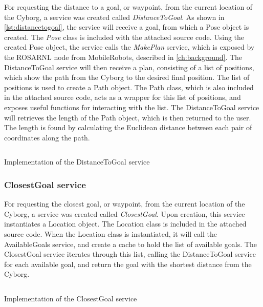 \documentclass[\rootfolder/main.tex]{subfiles}
\begin{document}
For requesting the distance to a goal, or waypoint, from the current location of the Cyborg, a service was created called \emph{DistanceToGoal}.
As shown in \cref{lst:distancetogoal}, the service will receive a goal, from which a Pose object is created.
The \emph{Pose} class is included with the attached source code.
Using the created Pose object, the service calls the \emph{MakePlan} service, which is exposed by the ROSARNL node from MobileRobots, described in \cref{ch:background}.
The DistanceToGoal service will then receive a plan, consisting of a list of positions, which show the path from the Cyborg to the desired final position.
The list of positions is used to create a Path object.
The Path class, which is also included in the attached source code, acts as a wrapper for this list of positions, and exposes useful functions for interacting with the list.
The DistanceToGoal service will retrieves the length of the Path object, which is then returned to the user.
The length is found by calculating the Euclidean distance between each pair of coordinates along the path.

\begin{listing}
    \inputminted{python}{\rootfolder/Chapters/Chapter6/Listings/distance_to_goal.py}
    \caption{Implementation of the DistanceToGoal service \label{lst:distancetogoal}}
\end{listing}

\subsubsection{ClosestGoal service}

For requesting the closest goal, or waypoint, from the current location of the Cyborg, a service was created called \emph{ClosestGoal}.
Upon creation, this service instantiates a Location object.
The Location class is included in the attached source code.
When the Location class is instantiated, it will call the AvailableGoals service, and create a cache to hold the list of available goals.
The ClosestGoal service iterates through this list, calling the DistanceToGoal service for each available goal, and return the goal with the shortest distance from the Cyborg.

\begin{listing}
    \inputminted{python}{\rootfolder/Chapters/Chapter6/Listings/closest_goal.py}
    \caption{Implementation of the ClosestGoal service \label{lst:closestgoal}}
\end{listing}
\end{document}
